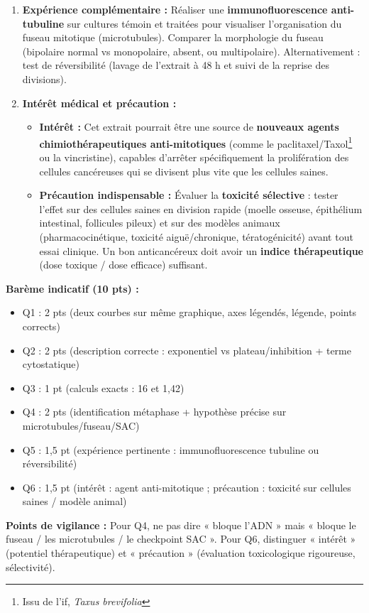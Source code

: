 \documentclass[11pt]{article}
\begin{document}
\begin{corrige}
\begin{enumerate}
\item \textbf{Expérience complémentaire :} Réaliser une \textbf{immunofluorescence anti-tubuline} sur cultures témoin et traitées pour visualiser l'organisation du fuseau mitotique (microtubules). Comparer la morphologie du fuseau (bipolaire normal vs monopolaire, absent, ou multipolaire). Alternativement : test de réversibilité (lavage de l'extrait à 48 h et suivi de la reprise des divisions).

\item \textbf{Intérêt médical et précaution :}
\begin{itemize}
\item \textbf{Intérêt :} Cet extrait pourrait être une source de \textbf{nouveaux agents chimiothérapeutiques anti-mitotiques} (comme le paclitaxel/Taxol\footnote{Issu de l'if, \emph{Taxus brevifolia}} ou la vincristine), capables d'arrêter spécifiquement la prolifération des cellules cancéreuses qui se divisent plus vite que les cellules saines.
\item \textbf{Précaution indispensable :} Évaluer la \textbf{toxicité sélective} : tester l'effet sur des cellules saines en division rapide (moelle osseuse, épithélium intestinal, follicules pileux) et sur des modèles animaux (pharmacocinétique, toxicité aiguë/chronique, tératogénicité) avant tout essai clinique. Un bon anticancéreux doit avoir un \textbf{indice thérapeutique} (dose toxique / dose efficace) suffisant.
\end{itemize}
\end{enumerate}

\textbf{Barème indicatif (10 pts) :}
\begin{itemize}
\item Q1 : 2 pts (deux courbes sur même graphique, axes légendés, légende, points corrects)
\item Q2 : 2 pts (description correcte : exponentiel vs plateau/inhibition + terme cytostatique)
\item Q3 : 1 pt (calculs exacts : 16 et 1,42)
\item Q4 : 2 pts (identification métaphase + hypothèse précise sur microtubules/fuseau/SAC)
\item Q5 : 1,5 pt (expérience pertinente : immunofluorescence tubuline ou réversibilité)
\item Q6 : 1,5 pt (intérêt : agent anti-mitotique ; précaution : toxicité sur cellules saines / modèle animal)
\end{itemize}

\textbf{Points de vigilance :} Pour Q4, ne pas dire « bloque l'ADN » mais « bloque le fuseau / les microtubules / le checkpoint SAC ». Pour Q6, distinguer « intérêt » (potentiel thérapeutique) et « précaution » (évaluation toxicologique rigoureuse, sélectivité).
\end{corrige}
\end{document}
